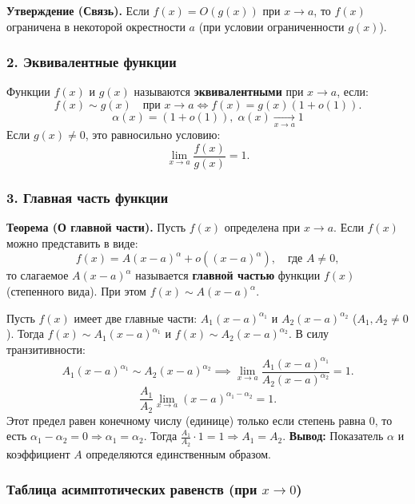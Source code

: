 \textbf{Утверждение (Связь).} Если $f(x) = O(g(x))$ при $x \to a$, то $f(x)$ ограничена в некоторой окрестности $a$ (при условии ограниченности $g(x)$).

\subsubsection*{2. Эквивалентные функции}

\begin{tcolorbox}[title=Определение]
	Функции $f(x)$ и $g(x)$ называются \textbf{эквивалентными} при $x \to a$, если:
	\[ f(x) \sim g(x) \quad \text{при } x \to a \iff f(x) = g(x)(1 + o(1)). \]
	\[ \alpha(x) = (1 + o(1)), \; \alpha(x) \xrightarrow[x\to a]{} 1 \]
	Если $g(x) \neq 0$, это равносильно условию:
	\[ \lim_{x\to a} \frac{f(x)}{g(x)} = 1. \]
\end{tcolorbox}

\subsubsection*{3. Главная часть функции}

\textbf{Теорема (О главной части).}
Пусть $f(x)$ определена при $x \to a$. Если $f(x)$ можно представить в виде:
\[ f(x) = A(x-a)^\alpha + o((x-a)^\alpha), \quad \text{где } A \neq 0, \]
то слагаемое $A(x-a)^\alpha$ называется \textbf{главной частью} функции $f(x)$ (степенного вида).
При этом $f(x) \sim A(x-a)^\alpha$.

\begin{tcolorbox}[title=Доказательство единственности главной части]
	Пусть $f(x)$ имеет две главные части: $A_1 (x-a)^{\alpha_1}$ и $A_2 (x-a)^{\alpha_2}$ ($A_1, A_2 \neq 0$).
	Тогда $f(x) \sim A_1 (x-a)^{\alpha_1}$ и $f(x) \sim A_2 (x-a)^{\alpha_2}$.
	В силу транзитивности:
	\[ A_1 (x-a)^{\alpha_1} \sim A_2 (x-a)^{\alpha_2} \implies \lim_{x\to a} \frac{A_1 (x-a)^{\alpha_1}}{A_2 (x-a)^{\alpha_2}} = 1. \]
	\[ \frac{A_1}{A_2} \lim_{x\to a} (x-a)^{\alpha_1 - \alpha_2} = 1. \]
	Этот предел равен конечному числу (единице) только если степень равна 0, то есть $\alpha_1 - \alpha_2 = 0 \Rightarrow \alpha_1 = \alpha_2$.
	Тогда $\frac{A_1}{A_2} \cdot 1 = 1 \Rightarrow A_1 = A_2$.
	\textbf{Вывод:} Показатель $\alpha$ и коэффициент $A$ определяются единственным образом.
\end{tcolorbox}

\subsubsection*{Таблица асимптотических равенств (при $x \to 0$)}

